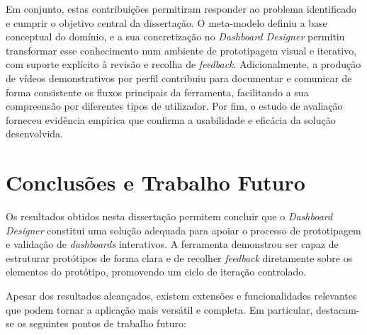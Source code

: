 Em conjunto, estas contribuições permitiram responder ao problema identificado e cumprir o objetivo central da dissertação. O meta-modelo definiu a base conceptual do domínio, e a sua concretização no \textit{Dashboard Designer} permitiu transformar esse conhecimento num ambiente de prototipagem visual e iterativo, com suporte explícito à revisão e recolha de \textit{feedback}. Adicionalmente, a produção de vídeos demonstrativos por perfil contribuiu para documentar e comunicar de forma consistente os fluxos principais da ferramenta, facilitando a sua compreensão por diferentes tipos de utilizador. Por fim, o estudo de avaliação forneceu evidência empírica que confirma a usabilidade e eficácia da solução desenvolvida.

\section{Conclusões e Trabalho Futuro}
\label{sec:cap6_trabalho_futuro}

Os resultados obtidos nesta dissertação permitem concluir que o \textit{Dashboard Designer} constitui uma solução adequada para apoiar o processo de prototipagem e validação de \textit{dashboards} interativos. A ferramenta demonstrou ser capaz de estruturar protótipos de forma clara e de recolher \textit{feedback} diretamente sobre os elementos do protótipo, promovendo um ciclo de iteração controlado.

Apesar dos resultados alcançados, existem extensões e funcionalidades relevantes que podem tornar a aplicação mais versátil e completa. Em particular, destacam-se os seguintes pontos de trabalho futuro:

